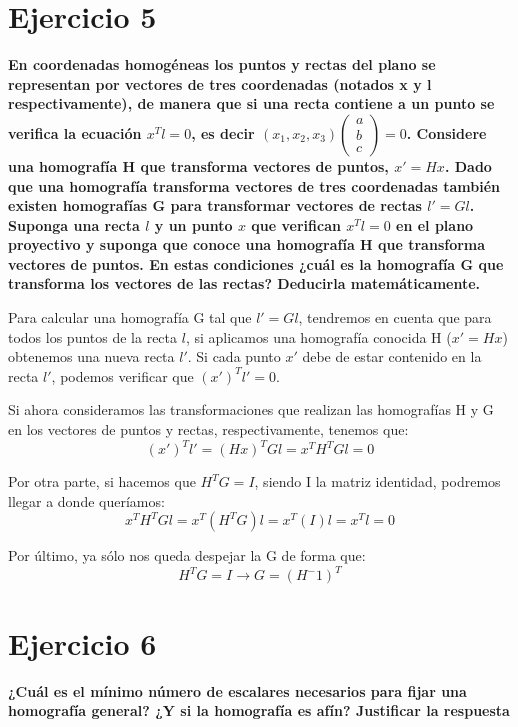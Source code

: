 \documentclass[11pt,a4paper]{article}
\begin{document}
\section*{Ejercicio 5}
\textbf{En coordenadas homogéneas los puntos y rectas del plano se representan por vectores de tres coordenadas (notados x y l respectivamente), de
manera que si una recta contiene a un punto se verifica la ecuación $x^Tl=0$, es decir $(x_1,x_2,x_3)\begin{pmatrix}a\\b\\c\end{pmatrix} = 0$.
Considere una homografía H que transforma vectores de puntos, $x' = Hx$. Dado que una homografía transforma vectores de tres coordenadas también
existen homografías G para transformar vectores de rectas $l' = Gl$. Suponga una recta $l$ y un punto $x$ que verifican $x^Tl=0$ en el plano proyectivo
y suponga que conoce una homografía H que transforma vectores de puntos. En estas condiciones ¿cuál es la homografía G que transforma los vectores de
las rectas? Deducirla matemáticamente.}

Para calcular una homografía G tal que $l'=Gl$, tendremos en cuenta que para todos los puntos de la recta $l$, si aplicamos una homografía conocida H
($x'=Hx$) obtenemos una nueva recta $l'$. Si cada punto $x'$ debe de estar contenido en la recta $l'$, podemos verificar que $(x')^Tl'=0$.

Si ahora consideramos las transformaciones que realizan las homografías H y G en los vectores de puntos y rectas, respectivamente, tenemos que:
\begin{equation*}
(x')^Tl' = (Hx)^T Gl = x^T H^T Gl = 0
\end{equation*}

Por otra parte, si hacemos que $H^TG=I$, siendo I la matriz identidad, podremos llegar a donde queríamos:
\begin{equation*}
x^T H^T Gl = x^T (H^T G) l = x^T (I) l = x^T l = 0
\end{equation*}

Por último, ya sólo nos queda despejar la G de forma que:
\begin{equation*}
H^T G = I \rightarrow G = (H^-1)^T
\end{equation*}

\section*{Ejercicio 6}
\textbf{¿Cuál es el mínimo número de escalares necesarios para fijar una homografía general? ¿Y si la homografía es afín? Justificar la respuesta}
\end{document}
